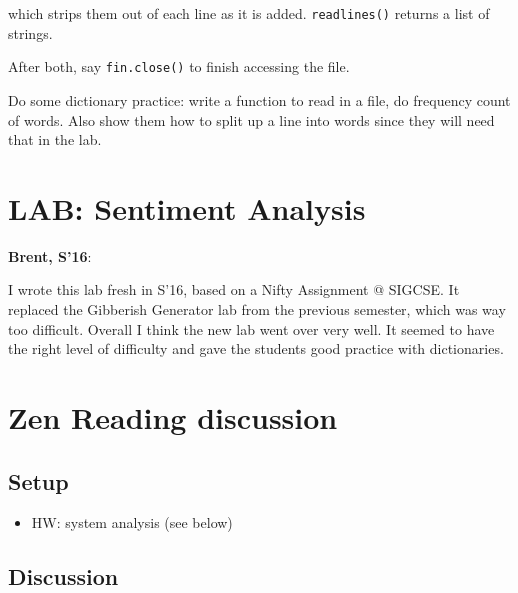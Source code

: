 \documentclass{article}
\newenvironment{reflect}[1]
{
  \noindent
  \begin{lrbox}{\reflectbox}
    \begin{minipage}[t]{\textwidth}
      \textbf{#1}:
}{
    \end{minipage}
  \end{lrbox}
  \fbox{\usebox{\reflectbox}}
}
\begin{document}
which strips them out of each line as it is added. \verb|readlines()|
returns a list of strings.

After both, say \verb|fin.close()| to finish accessing the file.

Do some dictionary practice: write a function to read in a file, do
frequency count of words.  Also show them how to split up a line into
words since they will need that in the lab.

\section*{LAB: Sentiment Analysis}

\begin{reflect}{Brent, S'16}
  I wrote this lab fresh in S'16, based on a Nifty Assignment @
  SIGCSE.  It replaced the Gibberish Generator lab from the previous
  semester, which was way too difficult.  Overall I think the new lab
  went over very well.  It seemed to have the right level of
  difficulty and gave the students good practice with dictionaries.
\end{reflect}

\section{Zen Reading discussion}

\subsection*{Setup}

\begin{itemize}
\item HW: system analysis (see below)
\end{itemize}

\subsection*{Discussion}
\end{document}
